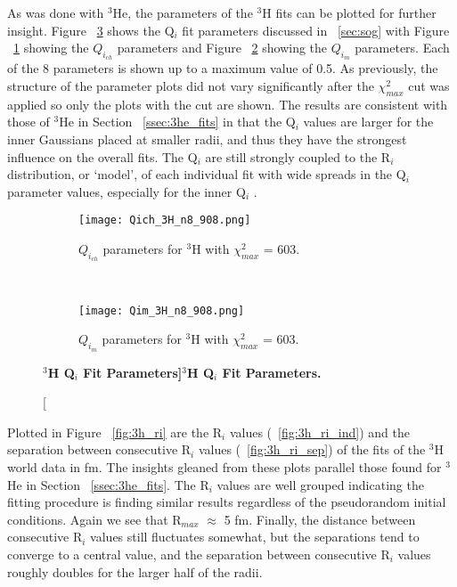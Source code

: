 As was done with $^3$He, the parameters of the $^3$H fits can be plotted for further insight. Figure ~\ref{fig:3h_qi} shows the Q$_i$ fit parameters discussed in ~\ref{sec:sog} with Figure ~\ref{fig:3h_qch} showing the $Q_{i_{ch}}$ parameters and Figure ~\ref{fig:3h_qm} showing the $Q_{i_{m}}$ parameters. Each of the 8 parameters is shown up to a maximum value of 0.5. As previously, the structure of the parameter plots did not vary significantly after the $\chi^2_{max}$ cut was applied so only the plots with the cut are shown. The results are consistent with those of $^3$He in Section ~\ref{ssec:3he_fits} in that the Q$_i$ values are larger for the inner Gaussians placed at smaller radii, and thus they have the strongest influence on the overall fits. The Q$_i$ are still strongly coupled to the R$_i$ distribution, or `model', of each individual fit with wide spreads in the Q$_i$ parameter values, especially for the inner Q$_i$ .

\begin{figure}[!ht]
\begin{subfigure}{1.\textwidth}
  \centering
  \texttt{[image: Qich\_3H\_n8\_908.png]}
  \caption{$Q_{i_{ch}}$ parameters for $^3$H with $\chi^2_{max}$ = 603.}
  \label{fig:3h_qch}
\end{subfigure}\\
\begin{subfigure}{1.\textwidth}
  \centering
  \texttt{[image: Qim\_3H\_n8\_908.png]}
  \caption{$Q_{i_{m}}$ parameters for $^3$H with $\chi^2_{max}$ = 603.}
  \label{fig:3h_qm}
\end{subfigure}
\caption[\bf{$^3$H Q$_i$ Fit Parameters}]{\bf{$^3$H Q$_i$ Fit Parameters.}}
\label{fig:3h_qi}
\end{figure}

Plotted in Figure ~\ref{fig:3h_ri} are the R$_i$ values (~\ref{fig:3h_ri_ind}) and the separation between consecutive R$_i$ values (~\ref{fig:3h_ri_sep}) of the fits of the $^3$H world data in fm. The insights gleaned from these plots parallel those found for $^3$He in Section ~\ref{ssec:3he_fits}. The R$_i$ values are well grouped indicating the fitting procedure is finding similar results regardless of the pseudorandom initial conditions. Again we see that  R$_{max}$ $\approx$ 5 fm. Finally, the distance between consecutive R$_i$ values still fluctuates somewhat, but the separations tend to converge to a central value, and the separation between consecutive R$_i$ values roughly doubles for the larger half of the radii.

